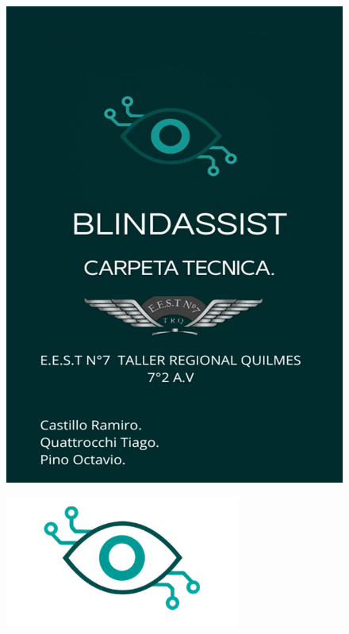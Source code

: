 \documentclass[12pt,a4paper]{article}
\begin{document}
\thispagestyle{empty}
\begin{figure}[H]
\includegraphics[width=\paperwidth,height=\paperheight]{Carpeta tecnica/Imagen1.jpg}
\end{figure}
\restoregeometry


\setcounter{page}{1}
\setcounter{tocdepth}{4} %
\setcounter{secnumdepth}{4}
\tableofcontents
    \begin{figure}[H]
    \centering %
    \includegraphics[width=0.7\linewidth]{Carpeta tecnica/logo indice.png} %
\end{figure}
\newpage
\end{document}
